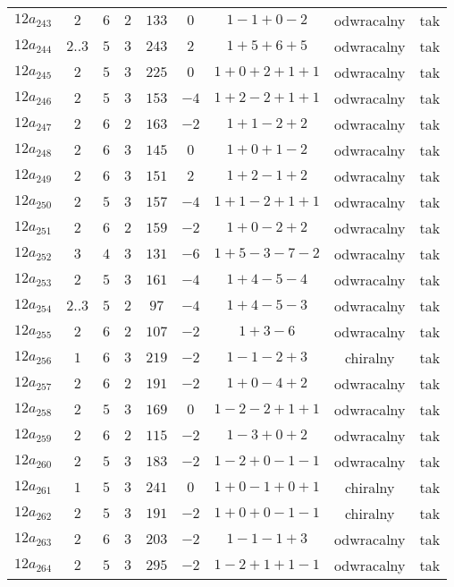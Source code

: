 \begin{longtable}{ccccccccc}
$12a_{243}$ & $2$ & $6$ & $2$ & $133$ & $0$ & $1-1+0-2$ & odwracalny & tak \\
$12a_{244}$ & $2..3$ & $5$ & $3$ & $243$ & $2$ & $1+5+6+5$ & odwracalny & tak \\
$12a_{245}$ & $2$ & $5$ & $3$ & $225$ & $0$ & $1+0+2+1+1$ & odwracalny & tak \\
$12a_{246}$ & $2$ & $5$ & $3$ & $153$ & $-4$ & $1+2-2+1+1$ & odwracalny & tak \\
$12a_{247}$ & $2$ & $6$ & $2$ & $163$ & $-2$ & $1+1-2+2$ & odwracalny & tak \\
$12a_{248}$ & $2$ & $6$ & $3$ & $145$ & $0$ & $1+0+1-2$ & odwracalny & tak \\
$12a_{249}$ & $2$ & $6$ & $3$ & $151$ & $2$ & $1+2-1+2$ & odwracalny & tak \\
$12a_{250}$ & $2$ & $5$ & $3$ & $157$ & $-4$ & $1+1-2+1+1$ & odwracalny & tak \\
$12a_{251}$ & $2$ & $6$ & $2$ & $159$ & $-2$ & $1+0-2+2$ & odwracalny & tak \\
$12a_{252}$ & $3$ & $4$ & $3$ & $131$ & $-6$ & $1+5-3-7-2$ & odwracalny & tak \\
$12a_{253}$ & $2$ & $5$ & $3$ & $161$ & $-4$ & $1+4-5-4$ & odwracalny & tak \\
$12a_{254}$ & $2..3$ & $5$ & $2$ & $97$ & $-4$ & $1+4-5-3$ & odwracalny & tak \\
$12a_{255}$ & $2$ & $6$ & $2$ & $107$ & $-2$ & $1+3-6$ & odwracalny & tak \\
$12a_{256}$ & $1$ & $6$ & $3$ & $219$ & $-2$ & $1-1-2+3$ & chiralny & tak \\
$12a_{257}$ & $2$ & $6$ & $2$ & $191$ & $-2$ & $1+0-4+2$ & odwracalny & tak \\
$12a_{258}$ & $2$ & $5$ & $3$ & $169$ & $0$ & $1-2-2+1+1$ & odwracalny & tak \\
$12a_{259}$ & $2$ & $6$ & $2$ & $115$ & $-2$ & $1-3+0+2$ & odwracalny & tak \\
$12a_{260}$ & $2$ & $5$ & $3$ & $183$ & $-2$ & $1-2+0-1-1$ & odwracalny & tak \\
$12a_{261}$ & $1$ & $5$ & $3$ & $241$ & $0$ & $1+0-1+0+1$ & chiralny & tak \\
$12a_{262}$ & $2$ & $5$ & $3$ & $191$ & $-2$ & $1+0+0-1-1$ & chiralny & tak \\
$12a_{263}$ & $2$ & $6$ & $3$ & $203$ & $-2$ & $1-1-1+3$ & odwracalny & tak \\
$12a_{264}$ & $2$ & $5$ & $3$ & $295$ & $-2$ & $1-2+1+1-1$ & odwracalny & tak \\

\end{longtable}
